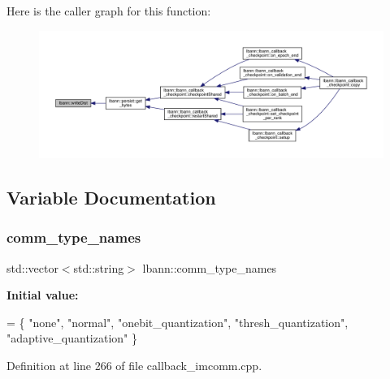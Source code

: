 Here is the caller graph for this function\+:\nopagebreak
\begin{figure}[H]
\begin{center}
\leavevmode
\includegraphics[width=350pt]{namespacelbann_af640a9302803636e0b5deb110c1aee57_icgraph}
\end{center}
\end{figure}


\subsection{Variable Documentation}
\mbox{\label{namespacelbann_add9e1dd52afa73f994d5d3a44c25a818}} 
\subsubsection{\texorpdfstring{comm\+\_\+type\+\_\+names}{comm\_type\_names}}
{\footnotesize\ttfamily std\+::vector$<$std\+::string$>$ lbann\+::comm\+\_\+type\+\_\+names\hspace{0.3cm}{\ttfamily [static]}}

{\bfseries Initial value\+:}
\begin{DoxyCode}
=
    \{ \textcolor{stringliteral}{"none"}, \textcolor{stringliteral}{"normal"}, \textcolor{stringliteral}{"onebit\_quantization"}, \textcolor{stringliteral}{"thresh\_quantization"}, \textcolor{stringliteral}{"adaptive\_quantization"} \}
\end{DoxyCode}


Definition at line 266 of file callback\+\_\+imcomm.\+cpp.

